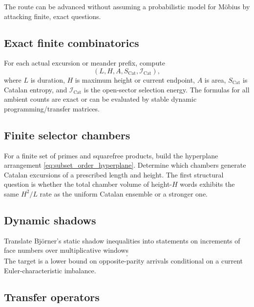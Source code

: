 \documentclass[11pt]{amsart}
\numberwithin{equation}{section}
\theoremstyle{plain}
\theoremstyle{definition}
\theoremstyle{remark}
\newcommand{\Icat}{\mathcal{I}_{\mathrm{Cat}}}
\begin{document}
The route can be advanced without assuming a probabilistic model for M\"obius by attacking finite, exact questions.

\subsection{Exact finite combinatorics}
\label{subsec:program_exact}

For each actual excursion or meander prefix, compute
\begin{equation}
(L,H,A,S_{\mathrm{Cat}},\Icat),
\label{eq:finite_observables}
\end{equation}
where $L$ is duration, $H$ is maximum height or current endpoint, $A$ is area, $S_{\mathrm{Cat}}$ is Catalan entropy, and $\Icat$ is the open-sector selection energy.  The formulas for all ambient counts are exact or can be evaluated by stable dynamic programming/transfer matrices.

\subsection{Finite selector chambers}
\label{subsec:program_chambers}

For a finite set of primes and squarefree products, build the hyperplane arrangement \eqref{eq:subset_order_hyperplane}.  Determine which chambers generate Catalan excursions of a prescribed length and height.  The first structural question is whether the total chamber volume of height-$H$ words exhibits the same $H^2/L$ rate as the uniform Catalan ensemble or a stronger one.

\subsection{Dynamic shadows}
\label{subsec:program_shadows}

Translate Bj\"orner's static shadow inequalities into statements on increments of face numbers over multiplicative windows
\begin{equation}
[x,xe^{\delta}].
\label{eq:multiplicative_window}
\end{equation}
The target is a lower bound on opposite-parity arrivals conditional on a current Euler-characteristic imbalance.

\subsection{Transfer operators}
\label{subsec:program_transfer}
\end{document}

